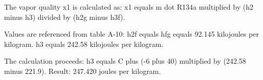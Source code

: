 The vapor quality x1 is calculated as:  
x1 equals m dot R134a multiplied by (h2 minus h3) divided by (h2g minus h3f).  

Values are referenced from table A-10:  
h2f equals hfg equals 92.145 kilojoules per kilogram.  
h3 equals 242.58 kilojoules per kilogram.  

The calculation proceeds:  
h3 equals C plus (-6 plus 40) multiplied by (242.58 minus 221.9).  
Result: 247.420 joules per kilogram.